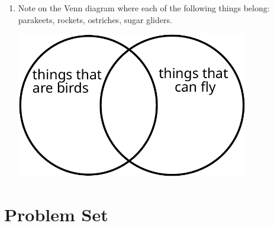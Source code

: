 \documentclass{tufte-book}
\begin{document}
\begin{enumerate}
  \item Note on the Venn diagram where each of the following things belong:
  parakeets, rockets, ostriches, sugar gliders.\par
  {\centering \includegraphics[width=0.8\textwidth]{maths/fig/venn_birds_fly.pdf}}

\end{enumerate}

\newpage\section{Problem Set }
\end{document}

